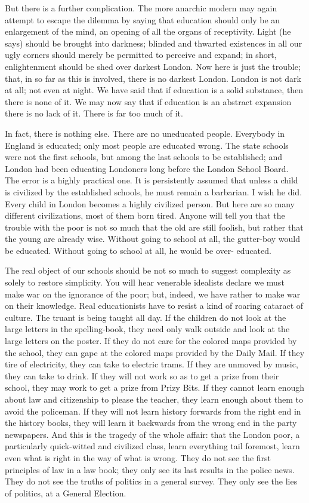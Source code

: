 \documentclass[final,10pt,letterpaper,twocolumn,openany]{book}
\begin{document}
But there is a further complication. The more anarchic modern may
again attempt to escape the dilemma by saying that education should only
be an enlargement of the mind, an opening of all the organs of receptivity.
Light (he says) should be brought into darkness; blinded and thwarted
existences in all our ugly corners should merely be permitted to perceive
and expand; in short, enlightenment should be shed over darkest London.
Now here is just the trouble; that, in so far as this is involved, there is no
darkest London. London is not dark at all; not even at night. We have said
that if education is a solid substance, then there is none of it. We may now
say that if education is an abstract expansion there is no lack of it. There is
far too much of it. 

In fact, there is nothing else. There are no uneducated
people. Everybody in England is educated; only most people are educated
wrong. The state schools were not the first schools, but among the last
schools to be established; and London had been educating Londoners long
before the London School Board. The error is a highly practical one. It is
persistently assumed that unless a child is civilized by the established
schools, he must remain a barbarian. I wish he did. Every child in London
becomes a highly civilized person. But here are so many different
civilizations, most of them born tired. Anyone will tell you that the trouble
with the poor is not so much that the old are still foolish, but rather that the
young are already wise. Without going to school at all, the gutter-boy
would be educated. Without going to school at all, he would be over-
educated. 

The real object of our schools should be not so much to suggest
complexity as solely to restore simplicity. You will hear venerable idealists
declare we must make war on the ignorance of the poor; but, indeed, we
have rather to make war on their knowledge. Real educationists have to
resist a kind of roaring cataract of culture. The truant is being taught all
day. If the children do not look at the large letters in the spelling-book,
they need only walk outside and look at the large letters on the poster. If
they do not care for the colored maps provided by the school, they can
gape at the colored maps provided by the Daily Mail. If they tire of
electricity, they can take to electric trams. If they are unmoved by music,
they can take to drink. If they will not work so as to get a prize from their
school, they may work to get a prize from Prizy Bits. If they cannot learn
enough about law and citizenship to please the teacher, they learn enough
about them to avoid the policeman. If they will not learn history forwards
from the right end in the history books, they will learn it backwards from
the wrong end in the party newspapers. And this is the tragedy of the
whole affair: that the London poor, a particularly quick-witted and
civilized class, learn everything tail foremost, learn even what is right in
the way of what is wrong. They do not see the first principles of law in a
law book; they only see its last results in the police news. They do not see
the truths of politics in a general survey. They only see the lies of politics,
at a General Election.
\end{document}
